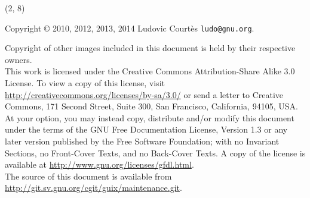 \documentclass{beamer}
\begin{document}
\begin{frame}{}

  \begin{textblock}{12}(2, 8)
    \tiny{
      Copyright \copyright{} 2010, 2012, 2013, 2014 Ludovic Courtès \texttt{ludo@gnu.org}.

      Copyright of other images included in this document is held by
      their respective owners.
      \\[3.0mm]
      This work is licensed under the \alert{Creative Commons
        Attribution-Share Alike 3.0} License.  To view a copy of this
      license, visit
      \url{http://creativecommons.org/licenses/by-sa/3.0/} or send a
      letter to Creative Commons, 171 Second Street, Suite 300, San
      Francisco, California, 94105, USA.
      \\[2.0mm]
      At your option, you may instead copy, distribute and/or modify
      this document under the terms of the \alert{GNU Free Documentation
        License, Version 1.3 or any later version} published by the Free
      Software Foundation; with no Invariant Sections, no Front-Cover
      Texts, and no Back-Cover Texts.  A copy of the license is
      available at \url{http://www.gnu.org/licenses/gfdl.html}.
      \\[2.0mm]
      The source of this document is available from
      \url{http://git.sv.gnu.org/cgit/guix/maintenance.git}.
    }
  \end{textblock}
\end{frame}
\end{document}
